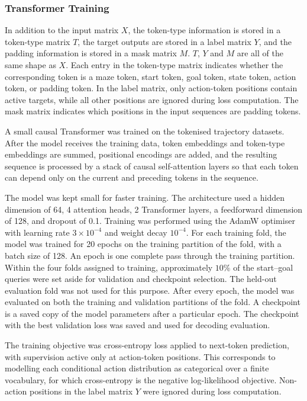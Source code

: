 ﻿\documentclass[12pt,a4paper]{article}
\theoremstyle{definition}
\begin{document}
\subsubsection{Transformer Training}

In addition to the input matrix $X$,
the token-type information is stored in a token-type matrix $T$, 
the target outputs are stored in a label matrix $Y$, and 
the padding information is stored in a mask matrix $M$. $T$, $Y$ and $M$ are all of the same shape as $X$.
Each entry in the token-type matrix indicates whether the corresponding token is a maze token, start token, goal token, 
state token, action token, or padding token. In the label matrix, only action-token positions contain 
active targets, while all other positions are ignored during loss computation. 
The mask matrix indicates which positions in the input sequences are padding tokens.

A small causal Transformer was trained on the tokenised trajectory datasets. 
After the model receives the training data, 
token embeddings and token-type embeddings are summed, positional encodings
are added, and the resulting sequence is processed by a stack of causal self-attention layers so that
each token can depend only on the current and preceding tokens in the sequence.

The model was kept small for faster training. The architecture used a hidden dimension of 64, 4 attention 
heads, 2 Transformer layers, a feedforward dimension of 128, and dropout of 0.1. Training was performed using the 
AdamW optimiser with learning rate $3 \times 10^{-4}$ and weight decay $10^{-4}$. For each training fold,
the model was trained for 20 epochs on the training partition of the fold, with a batch size of 128.
An epoch is one complete pass through the training partition.
Within the four folds assigned to training, approximately $10\%$ of the start--goal queries
were set aside for validation and checkpoint selection. The held-out evaluation fold was not used for this purpose.
After every epoch, the model was evaluated on both the training and validation partitions of the fold.
A checkpoint is a saved copy of the model parameters after a particular epoch.
The checkpoint with the best validation loss was saved and used for decoding evaluation.

The training objective was cross-entropy loss applied to next-token prediction, 
with supervision active only at action-token positions. This corresponds to modelling each 
conditional action distribution as categorical over a finite vocabulary, for which cross-entropy 
is the negative log-likelihood objective. Non-action positions in the 
label matrix $Y$ were ignored during loss computation.
\end{document}
